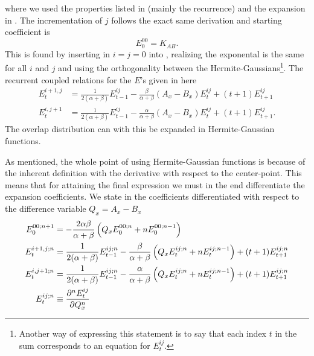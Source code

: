     where we used the properties listed in  (mainly
    the recurrence) and the expansion in . The incrementation
    of $j$ follows the exact same derivation and starting coefficient is
        \begin{equation}
            E^{00}_0 = K_{AB}.
        \end{equation}
    This is found by inserting in $i=j=0$ into , realizing
    the exponental is the same for all $i$ and $j$ and using the orthogonality
    between the Hermite-Gaussians\footnote{Another way of expressing this
    statement is to say that each index $t$ in the sum corresponds to an
    equation for $E^{ij}_t$.}. The recurrent coupled relations for the
    $E$'s given in here
        \begin{equation}
            \begin{aligned}
                E^{i+1,j}_t &= \frac{1}{2(\alpha + \beta)}E^{ij}_{t-1} -
                \frac{\beta}{\alpha+\beta}(A_x - B_x)E^{ij}_t +
                (t+1)E^{ij}_{t+1} \\
                E^{i,j+1}_t &= \frac{1}{2(\alpha + \beta)}E^{ij}_{t-1} -
                \frac{\alpha}{\alpha+\beta}(A_x - B_x)E^{ij}_t +
                (t+1)E^{ij}_{t+1}.
            \end{aligned}
            \label{eq:coupledreccoeff}
        \end{equation}
    The overlap distribution can with this be expanded in Hermite-Gaussian
    functions.

    As mentioned, the whole point of using Hermite-Gaussian functions is
    because of the inherent definition with the derivative with respect to the
    center-point. This means that for attaining the final expression we must in
    the end differentiate the expansion coefficients. We state in
     the coefficients differentiated with respect to the
    difference variable $Q_x=A_x-B_x$ 
        \begin{equation}
            \begin{aligned}
                E^{00;n+1}_0 &=
                -\frac{2\alpha\beta}{\alpha+\beta}\left(Q_xE^{00;n}_0 +
                nE^{00;n-1}_0\right) \\
                E^{i+1,j;n}_t &= \frac{1}{2(\alpha+\beta)}E^{ij;n}_{t-1} -
                \frac{\beta}{\alpha+\beta}\left(Q_xE^{ij;n}_t +
                nE^{ij;n-1}_t\right) + (t+1)E^{ij;n}_{t+1} \\
                E^{i,j+1;n}_t &= \frac{1}{2(\alpha+\beta)}E^{ij;n}_{t-1} -
                \frac{\alpha}{\alpha+\beta}\left(Q_xE^{ij;n}_t +
                nE^{ij;n-1}_t\right) + (t+1)E^{ij;n}_{t+1} \\
                E^{ij;n}_t &\equiv \frac{\mathrm{\partial}^n E^{ij}_t}{\mathrm{\partial} Q^n_x}
            \end{aligned}
            \label{eq:coeffdiffdef}
        \end{equation}

